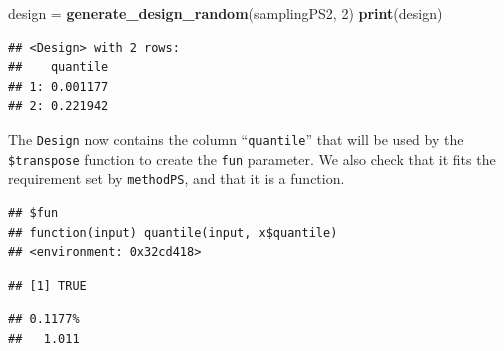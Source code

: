 \documentclass[]{scrbook}
\newenvironment{Shaded}{\begin{snugshade}}{\end{snugshade}}
\newcommand{\DecValTok}[1]{\textcolor[rgb]{0.00,0.00,0.81}{#1}}
\newcommand{\KeywordTok}[1]{\textcolor[rgb]{0.13,0.29,0.53}{\textbf{#1}}}
\newcommand{\NormalTok}[1]{#1}
\newcommand{\OperatorTok}[1]{\textcolor[rgb]{0.81,0.36,0.00}{\textbf{#1}}}
\newcommand{\StringTok}[1]{\textcolor[rgb]{0.31,0.60,0.02}{#1}}
\renewenvironment{Shaded} {\begin{snugshade}\small} {\end{snugshade}}
\begin{document}
\begin{Shaded}
\begin{Highlighting}[]
\NormalTok{design =}\StringTok{ }\KeywordTok{generate_design_random}\NormalTok{(samplingPS2, }\DecValTok{2}\NormalTok{)}
\KeywordTok{print}\NormalTok{(design)}
\end{Highlighting}
\end{Shaded}

\begin{verbatim}
## <Design> with 2 rows:
##    quantile
## 1: 0.001177
## 2: 0.221942
\end{verbatim}

The \texttt{Design} now contains the column ``\texttt{quantile}'' that will be used by the \texttt{\$transpose} function to create the \texttt{fun} parameter.
We also check that it fits the requirement set by \texttt{methodPS}, and that it is a function.

\begin{Shaded}
\end{Shaded}

\begin{verbatim}
## $fun
## function(input) quantile(input, x$quantile)
## <environment: 0x32cd418>
\end{verbatim}

\begin{Shaded}
\end{Shaded}

\begin{verbatim}
## [1] TRUE
\end{verbatim}

\begin{Shaded}
\end{Shaded}

\begin{verbatim}
## 0.1177% 
##   1.011
\end{verbatim}
\end{document}
